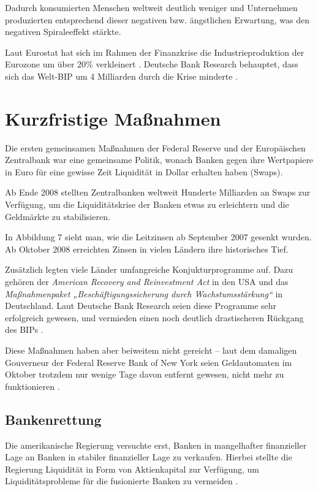 \documentclass[a4paper,11pt]{report}
\begin{document}
Dadurch konsumierten Menschen weltweit deutlich weniger
und Unternehmen produzierten entsprechend dieser 
negativen bzw. \"angstlichen Erwartung, was den negativen Spiraleeffekt st\"arkte.

Laut Eurostat hat sich im Rahmen der Finanzkrise
die Industrieproduktion der 
Eurozone um \"uber 20\% verkleinert \parencite[1--3]{eurostat}.
Deutsche Bank Research behauptet, dass sich das Welt-BIP um
4 Milliarden durch die Krise minderte \parencite{dbnotabb}.

\section{Kurzfristige Maßnahmen}
Die ersten gemeinsamen Maßnahmen der 
Federal Reserve und der Europäischen
Zentralbank war eine
gemeinsame Politik, wonach Banken gegen ihre
Wertpapiere in Euro f\"ur eine gewisse Zeit
Liquidit\"at in Dollar erhalten haben (Swaps).

Ab Ende 2008 stellten Zentralbanken weltweit
Hunderte Milliarden an Swaps zur Verf\"ugung,
um die Liquidit\"atskrise der Banken etwas zu erleichtern
und die Geldm\"arkte zu stabilisieren.

In Abbildung 7 sieht man, wie die Leitzinsen ab September
2007 gesenkt wurden. Ab Oktober 2008 erreichten Zinsen
in vielen L\"andern ihre historisches Tief.

Zus\"atzlich legten viele L\"ander umfangreiche Konjukturprogramme
auf. Dazu geh\"oren der \textit{American Recovery and Reinvestment Act} in den
USA und das \textit{Maßnahmenpaket „Beschäftigungssicherung durch Wachstumsstärkung“}
in Deutschland. Laut Deutsche Bank Research seien diese Programme sehr erfolgreich
gewesen, und vermieden einen noch deutlich drastischeren R\"uckgang des BIPs \parencite{dbnotabb}.

Diese Maßnahmen haben aber beiweitem nicht gereicht -- laut
dem damaligen Gouverneur der Federal Reserve Bank of New York
seien Geldautomaten im Oktober trotzdem nur wenige Tage
davon entfernt gewesen, nicht mehr zu funktionieren \parencite{geithneryt}.

\subsection{Bankenrettung}
Die amerikanische Regierung versuchte erst, Banken
in mangelhafter finanzieller Lage an Banken in stabiler finanzieller Lage
zu verkaufen. Hierbei stellte die Regierung Liquidit\"at in Form
von Aktienkapital zur Verf\"ugung,
um Liquidit\"atsprobleme f\"ur die fusionierte Banken zu vermeiden \parencite{paulsonyt}.
\end{document}

